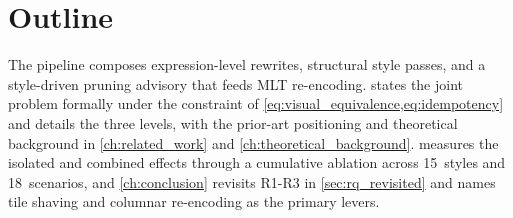\section{Outline}\label{sec:outline}

The pipeline composes expression-level rewrites, structural style passes, and a style-driven pruning advisory that feeds \ac{MLT} re-encoding.  states the joint problem formally under the constraint of \cref{eq:visual_equivalence,eq:idempotency} and details the three levels, with the prior-art positioning and theoretical background in \cref{ch:related_work} and \cref{ch:theoretical_background}.
 measures the isolated and combined effects through a cumulative ablation across 15~styles and 18~scenarios, and \cref{ch:conclusion} revisits R1-R3 in \cref{sec:rq_revisited} and names tile shaving and columnar re-encoding as the primary levers.
